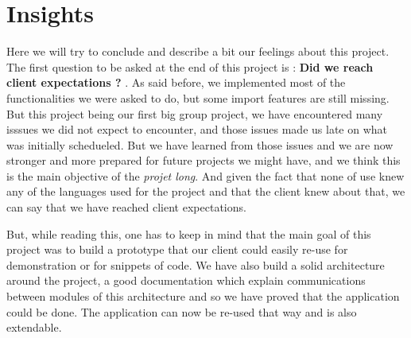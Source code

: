\section{Insights}
Here we will try to conclude and describe a bit our feelings about this project. The first question to be asked at the end of this project is : \textbf{Did we reach client expectations ?} . 
As said before, we implemented most of the functionalities we were asked to do, but some import features are still missing. But this project being our first big group project, we have encountered many isssues we did not expect
to encounter, and those issues made us late on what was initially schedueled. But we have learned from those issues and we are now stronger and more prepared for future projects we might have, and we think this is the 
main objective of the \textit{projet long}. And given the fact that none of use knew any of the languages used for the project and that the client knew about that, we can say that we have reached client expectations.

But, while reading this, one has to keep in mind that the main goal of this project was to build a prototype that our client could easily re-use for demonstration or for snippets of code. We have also build a solid 
architecture around the project, a good documentation which explain communications between modules of this architecture	and so we have proved that the application could be done. The application can now be re-used that way and is 
also extendable.


